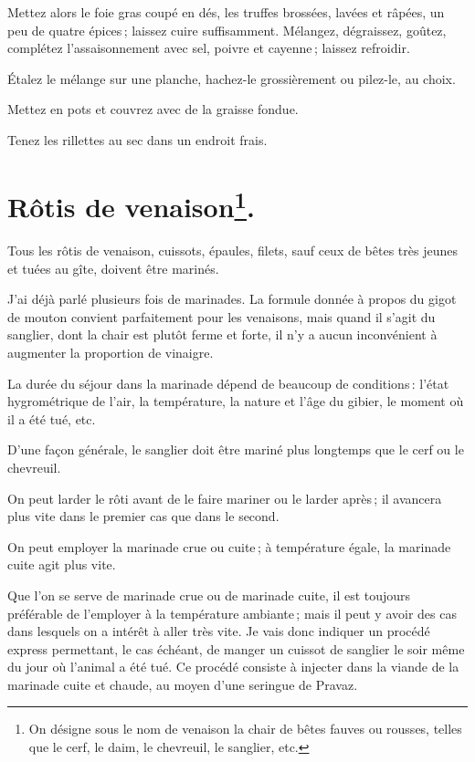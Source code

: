Mettez alors le foie gras coupé en dés, les truffes brossées, lavées et râpées,
un peu de quatre épices ; laissez cuire suffisamment. Mélangez, dégraissez,
goûtez, complétez l'assaisonnement avec sel, poivre et cayenne ; laissez
refroidir.

Étalez le mélange sur une planche, hachez-le grossièrement ou pilez-le, au
choix.

Mettez en pots et couvrez avec de la graisse fondue.

Tenez les rillettes au sec dans un endroit frais.

\section*{\centering Rôtis de venaison\footnote{On désigne sous le nom de
venaison la chair de bêtes fauves ou rousses, telles que le cerf, le daim, le
chevreuil, le sanglier, etc.}.}
{}

Tous les rôtis de venaison, cuissots, épaules, filets, sauf ceux de bêtes très
jeunes et tuées au gîte, doivent être marinés.

J'ai déjà parlé plusieurs fois de marinades. La formule donnée à propos du
gigot de mouton convient parfaitement pour les venaisons, mais quand il s'agit du
sanglier, dont la chair est plutôt ferme et forte, il n'y a aucun inconvénient à
augmenter la proportion de vinaigre.

La durée du séjour dans la marinade dépend de beaucoup de conditions : l'état
hygrométrique de l'air, la température, la nature et l'âge du gibier, le moment
où il a été tué, etc.

D'une façon générale, le sanglier doit être mariné plus longtemps que le cerf
ou le chevreuil.

On peut larder le rôti avant de le faire mariner ou le larder après ; il
avancera plus vite dans le premier cas que dans le second.

On peut employer la marinade crue ou cuite ; à température égale, la marinade
cuite agit plus vite.

Que l'on se serve de marinade crue ou de marinade cuite, il est toujours
préférable de l'employer à la température ambiante ; mais il peut y avoir des
cas dans lesquels on a intérêt à aller très vite. Je vais donc indiquer un
procédé express permettant, le cas échéant, de manger un cuissot de sanglier le
soir même du jour où l'animal a été tué. Ce procédé consiste à injecter dans la
viande de la marinade cuite et chaude, au moyen d'une seringue de Pravaz.

